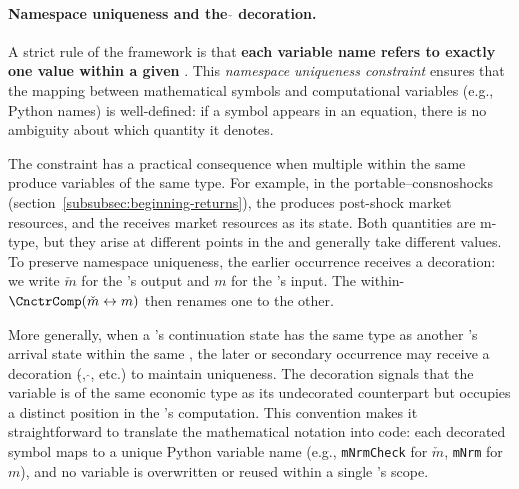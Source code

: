 \documentclass[titlepage, headings=optiontotocandhead]{econark}
\begin{document}
\hypertarget{namespace-uniqueness}{}
\paragraph{Namespace uniqueness and the $\check{}$ decoration.}
A strict rule of the framework is that \textbf{each variable name refers
to exactly one value within a given {\interval}}. This
\textit{namespace uniqueness constraint} ensures that the mapping between
mathematical symbols and computational variables (e.g., Python names) is
well-defined: if a symbol appears in an equation, there is no ambiguity
about which quantity it denotes.

The constraint has a practical consequence when multiple {\stgs} within
the same {\interval} produce variables of the same type. For example,
in the portable--consnoshocks {\interval}
(section~\ref{subsubsec:beginning-returns}), the 
{\stg} produces post-shock market resources, and the
 {\stg} receives market resources as its
{\Arrival} state. Both quantities are m-type, but they arise at
different points in the {\interval} and generally take different values.
To preserve namespace uniqueness, the earlier occurrence receives a
decoration: we write $\check{m}$ for the  {\stg}'s
output and $m$ for the  {\stg}'s input.
The within-{\interval} {\Cnct}
$\CnctrComp(\check{m} \leftrightarrow m)$ then renames one to
the other.

More generally, when a {\stg}'s continuation state has the same type as
another {\stg}'s arrival state within the same {\interval}, the later or
secondary occurrence may receive a decoration ($\check{}$, $\hat{}$,
etc.) to maintain uniqueness. The decoration signals that the variable
is of the same economic type as its undecorated counterpart but occupies
a distinct position in the {\interval}'s computation. This convention
makes it straightforward to translate the mathematical notation into code:
each decorated symbol maps to a unique Python variable name (e.g.,
\texttt{mNrmCheck} for $\check{m}$, \texttt{mNrm} for $m$),
and no variable is overwritten or reused within a single {\interval}'s
scope.

  


\end{document}
